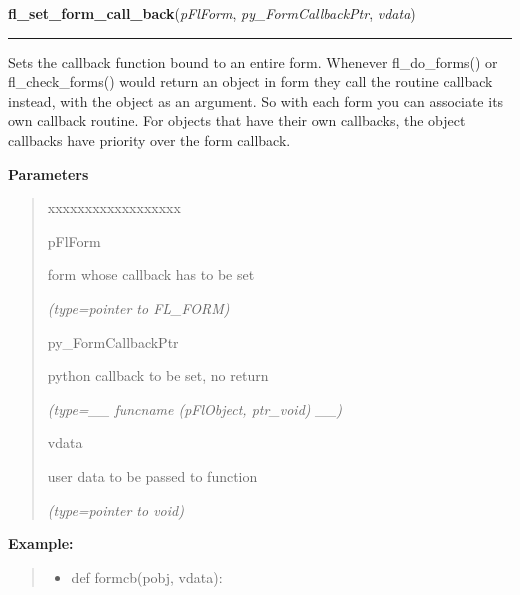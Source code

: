 \hspace{.8\funcindent}\begin{boxedminipage}{\funcwidth}

    \raggedright \textbf{fl\_set\_form\_call\_back}(\textit{pFlForm}, \textit{py\_FormCallbackPtr}, \textit{vdata})

    \vspace{-1.5ex}

    \rule{\textwidth}{0.5\fboxrule}
\setlength{\parskip}{2ex}
    Sets the callback function bound to an entire form. Whenever 
    fl\_do\_forms() or fl\_check\_forms() would return an object in form 
    they call the routine callback instead, with the object as an argument.
    So with each form you can associate its own callback routine. For 
    objects that have their own callbacks, the object callbacks have 
    priority over the form callback.

\setlength{\parskip}{1ex}
      \textbf{Parameters}
      \vspace{-1ex}

      \begin{quote}
        \begin{Ventry}{xxxxxxxxxxxxxxxxxx}

          \item[pFlForm]

          form whose callback has to be set

            {\it (type=pointer to FL\_FORM)}

          \item[py\_FormCallbackPtr]

          python callback to be set, no return

            {\it (type=\_\_ funcname (pFlObject, ptr\_void) \_\_)}

          \item[vdata]

          user data to be passed to function

            {\it (type=pointer to void)}

        \end{Ventry}

      \end{quote}

\textbf{Example:}
\begin{quote}
  \begin{itemize}

  \item
    \setlength{\parskip}{0.6ex}
def formcb(pobj, vdata):




\end{itemize}
\end{quote}
\end{boxedminipage}
